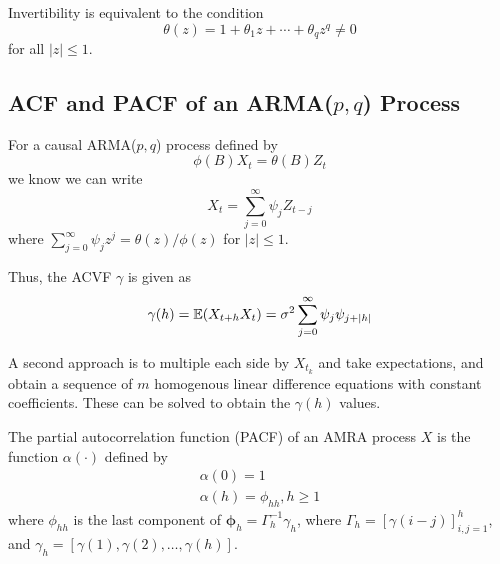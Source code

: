 \begin{thm}
  \label{defn:arma_processes:6}
  Invertibility is equivalent to the condition
  \begin{equation}
    \label{eq:24}
    \theta(z) = 1 + \theta_{1}z + \cdots + \theta_{q} z^{q} \neq 0
  \end{equation} for all $|z| \leq 1$.
\end{thm}

\subsection{ACF and PACF of an ARMA($p, q$) Process}
\label{sec:acf-pacf-an}

\begin{thm}
  \label{defn:arma_processes:7}
  For a causal ARMA($p, q$) process defined by
  \begin{equation}
    \label{eq:28}
    \phi(B) X_{t} = \theta(B) Z_{t}
  \end{equation} we know we can write
  \begin{equation}
    \label{eq:29}
    X_{t} = \sum_{j=0}^{\infty} \psi_{j} Z_{t-j}
  \end{equation} where $\sum_{j=0}^{\infty} \psi_{j} z^{j} = \theta(z)
  / \phi(z)$ for $|z| \leq 1$.

  Thus, the ACVF $\gamma$ is given as
  \begin{equation}
    \label{eq:30}
    \gamma(h) = \E{X_{t+h} X_{t}} = \sigma^{2} \sum_{j=0}^{\infty}
    \psi_{j} \psi_{j+|h|}
  \end{equation}

  A second approach is to multiple each side by $X_{t_k}$ and take
  expectations, and obtain a sequence of $m$ homogenous linear
  difference equations with constant coefficients.  These can be
  solved to obtain the $\gamma(h)$ values. 
\end{thm}

\begin{defn}[PACF]
  \label{defn:arma_processes:8}
  The partial autocorrelation function (PACF) of an AMRA process $X$
  is the function $\alpha(\cdot)$ defined by
  \begin{align}
    \label{eq:31}
    \alpha(0) = 1 \\
    \alpha(h) = \phi_{hh}, h \geq 1
  \end{align} where $\phi_{hh}$ is the last component of
  $\mathbf{\phi}_{h} = \Gamma_{h}^{-1} \gamma_{h}$, where $\Gamma_{h}
  = [\gamma(i - j)]^{h}_{i,j = 1}$, and $\gamma_{h} = [\gamma(1),
  \gamma(2), \dots, \gamma(h)]$.
\end{defn}

